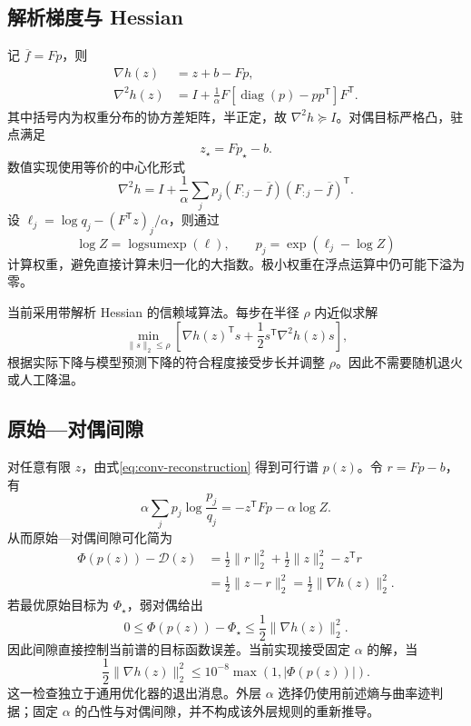 \documentclass[UTF8,fontset=fandol,11pt]{ctexart}
\begin{document}
\subsection{解析梯度与 Hessian}
记 $\overline f=Fp$，则
\begin{align}
    \nabla h(z)&=z+b-Fp,\\
    \nabla^2h(z)&=I+\frac1\alpha F\left[\operatorname{diag}(p)-pp^{\mathsf T}\right]F^{\mathsf T}.
\end{align}
其中括号内为权重分布的协方差矩阵，半正定，故 $\nabla^2h\succeq I$。对偶目标严格凸，驻点满足
\begin{equation}
    z_\star=Fp_\star-b.
\end{equation}
数值实现使用等价的中心化形式
\begin{equation}
    \nabla^2h=I+\frac1\alpha\sum_jp_j(F_{:j}-\overline f)(F_{:j}-\overline f)^{\mathsf T}.
\end{equation}
设 $\ell_j=\log q_j-(F^{\mathsf T}z)_j/\alpha$，则通过
\begin{equation}
    \log Z=\operatorname{logsumexp}(\ell),\qquad p_j=\exp(\ell_j-\log Z)
\end{equation}
计算权重，避免直接计算未归一化的大指数。极小权重在浮点运算中仍可能下溢为零。

当前采用带解析 Hessian 的信赖域算法。每步在半径 $\rho$ 内近似求解
\begin{equation}
    \min_{\|s\|_2\leq\rho}\left[\nabla h(z)^{\mathsf T}s+\frac12s^{\mathsf T}\nabla^2h(z)s\right],
\end{equation}
根据实际下降与模型预测下降的符合程度接受步长并调整 $\rho$。因此不需要随机退火或人工降温。

\subsection{原始---对偶间隙}
对任意有限 $z$，由式\eqref{eq:conv-reconstruction} 得到可行谱 $p(z)$。令 $r=Fp-b$，有
\begin{equation}
    \alpha\sum_jp_j\log\frac{p_j}{q_j}=-z^{\mathsf T}Fp-\alpha\log Z.
\end{equation}
从而原始---对偶间隙可化简为
\begin{align}
    \Phi(p(z))-\mathcal D(z)&=\frac12\|r\|_2^2+\frac12\|z\|_2^2-z^{\mathsf T}r\\
    &=\frac12\|z-r\|_2^2=\frac12\|\nabla h(z)\|_2^2.
\end{align}
若最优原始目标为 $\Phi_\star$，弱对偶给出
\begin{equation}
    0\leq\Phi(p(z))-\Phi_\star\leq\frac12\|\nabla h(z)\|_2^2.
\end{equation}
因此间隙直接控制当前谱的目标函数误差。当前实现接受固定 $\alpha$ 的解，当
\begin{equation}
    \frac12\|\nabla h(z)\|_2^2\leq10^{-8}\max(1,|\Phi(p(z))|).
\end{equation}
这一检查独立于通用优化器的退出消息。外层 $\alpha$ 选择仍使用前述熵与曲率迹判据；固定 $\alpha$ 的凸性与对偶间隙，并不构成该外层规则的重新推导。
\end{document}
